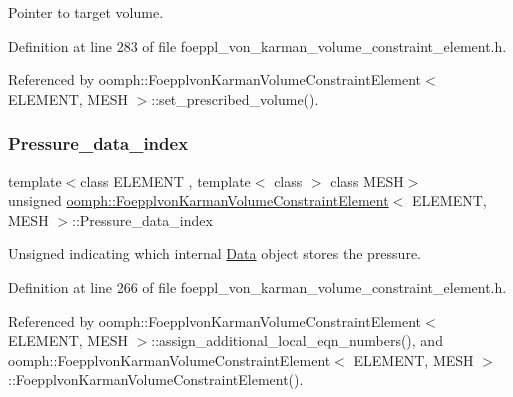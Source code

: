 Pointer to target volume. 



Definition at line 283 of file foeppl\+\_\+von\+\_\+karman\+\_\+volume\+\_\+constraint\+\_\+element.\+h.



Referenced by oomph\+::\+Foepplvon\+Karman\+Volume\+Constraint\+Element$<$ E\+L\+E\+M\+E\+N\+T, M\+E\+S\+H $>$\+::set\+\_\+prescribed\+\_\+volume().

\mbox{\label{classoomph_1_1FoepplvonKarmanVolumeConstraintElement_a3881d17c5bdda4a71815f1fedfeb4185}} 
\subsubsection{\texorpdfstring{Pressure\+\_\+data\+\_\+index}{Pressure\_data\_index}}
{\footnotesize\ttfamily template$<$class E\+L\+E\+M\+E\+NT , template$<$ class $>$ class M\+E\+SH$>$ \\
unsigned \hyperlink{classoomph_1_1FoepplvonKarmanVolumeConstraintElement}{oomph\+::\+Foepplvon\+Karman\+Volume\+Constraint\+Element}$<$ E\+L\+E\+M\+E\+NT, M\+E\+SH $>$\+::Pressure\+\_\+data\+\_\+index\hspace{0.3cm}{\ttfamily [protected]}}



Unsigned indicating which internal \hyperlink{classoomph_1_1Data}{Data} object stores the pressure. 



Definition at line 266 of file foeppl\+\_\+von\+\_\+karman\+\_\+volume\+\_\+constraint\+\_\+element.\+h.



Referenced by oomph\+::\+Foepplvon\+Karman\+Volume\+Constraint\+Element$<$ E\+L\+E\+M\+E\+N\+T, M\+E\+S\+H $>$\+::assign\+\_\+additional\+\_\+local\+\_\+eqn\+\_\+numbers(), and oomph\+::\+Foepplvon\+Karman\+Volume\+Constraint\+Element$<$ E\+L\+E\+M\+E\+N\+T, M\+E\+S\+H $>$\+::\+Foepplvon\+Karman\+Volume\+Constraint\+Element().

\mbox{\label{classoomph_1_1FoepplvonKarmanVolumeConstraintElement_a0c3ee6a6c6c4f5eb93f9540c6d400f26}} 
